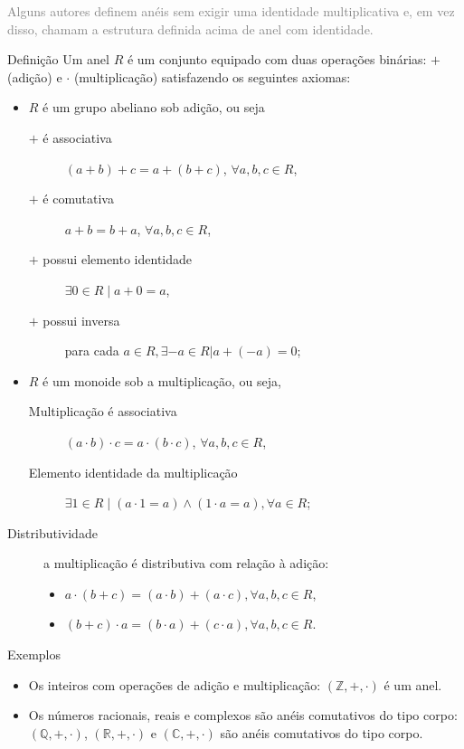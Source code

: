 \begin{frame}[allowframebreaks]
\vspace{2ex}
\textcolor{gray}{\small Alguns autores definem anéis sem exigir uma identidade multiplicativa e, em vez disso, chamam a estrutura definida acima de anel com identidade.}

\framebreak
\begin{block}{Definição}
\fontsize{11pt}{12pt}\selectfont
Um anel $R$ é um conjunto equipado com duas operações binárias: $+$ (adição) e $\cdot$ (multiplicação) satisfazendo os seguintes axiomas:
  \begin{itemize}
    \item $R$ é um grupo abeliano sob adição, ou seja
      \begin{description}
        \item[$+$ é associativa] $(a + b) + c = a + (b + c)$, $\forall a,b,c \in R$,
        \item[$+$ é comutativa] $a + b = b + a$, $\forall a,b,c \in R$,
        \item[$+$ possui elemento identidade] $\exists 0 \in R \mid a + 0 = a$,
        \item[$+$ possui inversa] para cada $a \in R, \exists -a \in R | a + (-a) = 0$;
      \end{description}
    \item $R$ é um monoide sob a multiplicação, ou seja,
      \begin{description}
        \item[Multiplicação é associativa] $(a \cdot b) \cdot c = a \cdot (b \cdot c)$, $\forall a,b,c \in R$,
	\item[Elemento identidade da multiplicação] $\exists 1 \in R \mid (a \cdot 1 = a) \land (1 \cdot a = a), \forall a \in R$;
      \end{description}
  \end{itemize}
  \begin{description}
    \item[Distributividade] a multiplicação é distributiva com relação à adição:
      \begin{itemize}
        \item $a \cdot (b + c) = (a \cdot b) + (a \cdot c), \forall a, b, c \in R$,
        \item $(b + c) \cdot a = (b \cdot a) + (c \cdot a), \forall a, b, c \in R$.
      \end{itemize}
  \end{description}
\end{block}

\framebreak
\begin{block}{Exemplos}
  \begin{itemize}
    \item Os inteiros com operações de adição e multiplicação: $(\mathbb{Z},+,\cdot)$ é um anel.
    \item Os números racionais, reais e complexos são anéis comutativos do tipo corpo: $(\mathbb{Q},+,\cdot)$, $(\mathbb{R},+,\cdot)$ e $(\mathbb{C},+,\cdot)$ são anéis comutativos do tipo corpo.
  \end{itemize}
\end{block}




\end{frame}
